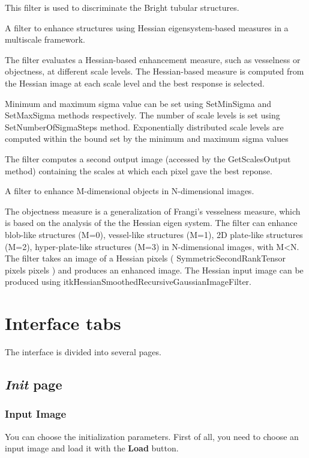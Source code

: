 \documentclass{article}
\begin{document}
This filter is used to discriminate the Bright tubular structures.

A filter to enhance structures using Hessian eigensystem-based measures in a multiscale framework.

The filter evaluates a Hessian-based enhancement measure, such as vesselness or objectness, at different scale levels. The Hessian-based measure is computed from the Hessian image at each scale level and the best response is selected.

Minimum and maximum sigma value can be set using SetMinSigma and SetMaxSigma methods respectively. The number of scale levels is set using SetNumberOfSigmaSteps method. Exponentially distributed scale levels are computed within the bound set by the minimum and maximum sigma values

The filter computes a second output image (accessed by the GetScalesOutput method) containing the scales at which each pixel gave the best reponse.

A filter to enhance M-dimensional objects in N-dimensional images.

The objectness measure is a generalization of Frangi's vesselness measure, which is based on the analysis of the the Hessian eigen system. The filter can enhance blob-like structures (M=0), vessel-like structures (M=1), 2D plate-like structures (M=2), hyper-plate-like structures (M=3) in N-dimensional images, with M<N. The filter takes an image of a Hessian pixels ( SymmetricSecondRankTensor pixels pixels ) and produces an enhanced image. The Hessian input image can be produced using itkHessianSmoothedRecursiveGaussianImageFilter.

\section{Interface tabs}

The interface is divided into several pages.

\subsection{\emph{Init} page}

\subsubsection{Input Image}
You can choose the initialization parameters.
First of all, you need to choose an input image and load it with the {\bf Load} button.
\end{document}
